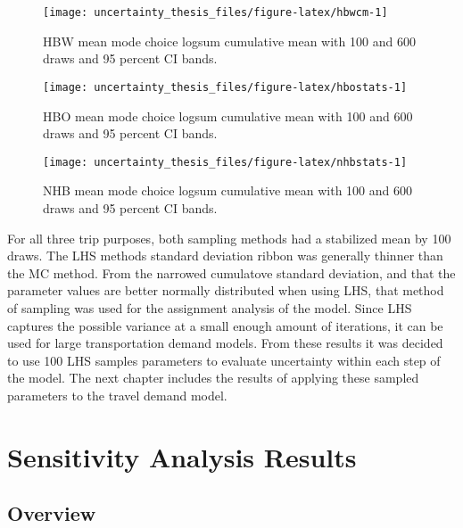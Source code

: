 \documentclass[fancy, masters, twoside]{byuthesis}
\begin{document}
\begin{figure}

{\centering \texttt{[image: uncertainty\_thesis\_files/figure-latex/hbwcm-1]} 

}

\caption{HBW mean mode choice logsum cumulative mean with 100 and 600 draws and 95 percent CI bands.}\label{fig:hbwcm}
\end{figure}

\begin{figure}

{\centering \texttt{[image: uncertainty\_thesis\_files/figure-latex/hbostats-1]} 

}

\caption{HBO mean mode choice logsum cumulative mean with 100 and 600 draws and 95 percent CI bands.}\label{fig:hbostats}
\end{figure}

\begin{figure}

{\centering \texttt{[image: uncertainty\_thesis\_files/figure-latex/nhbstats-1]} 

}

\caption{NHB mean mode choice logsum cumulative mean with 100 and 600 draws and 95 percent CI bands.}\label{fig:nhbstats}
\end{figure}

For all three trip purposes, both sampling methods had a stabilized mean by 100 draws. The LHS methods standard deviation ribbon was generally thinner than the MC method. From the narrowed cumulatove standard deviation, and that the parameter values are better normally distributed when using LHS, that method of sampling was used for the assignment analysis of the model. Since LHS captures the possible variance at a small enough amount of iterations, it can be used for large transportation demand models. From these results it was decided to use 100 LHS samples parameters to evaluate uncertainty within each step of the model. The next chapter includes the results of applying these sampled parameters to the travel demand model.

\hypertarget{sensitivity-analysis-results}{%
\chapter{Sensitivity Analysis Results}\label{sensitivity-analysis-results}}

\hypertarget{overview-1}{%
\section{Overview}\label{overview-1}}
\end{document}

